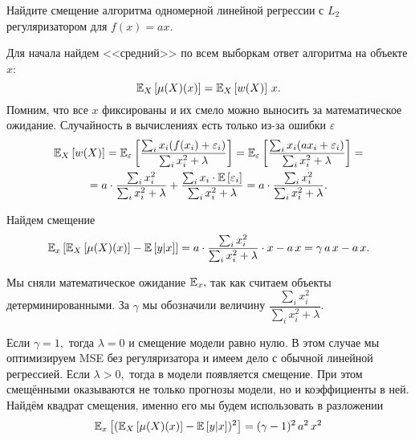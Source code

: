 \documentclass[12pt,fleqn]{article}
\begin{document}
\begin{vkProblem}
Найдите смещение алгоритма одномерной линейной регрессии с $L_2$ регуляризатором для $f(x) = ax$.
\end{vkProblem}
\begin{esSolution}
    Для начала найдем <<средний>> по всем выборкам ответ алгоритма на объекте $x$:
    $$
    \mathbb{E}_{X}\left[\mu(X)(x)\right] = \mathbb{E}_{X}\left[w(X)\right] \, x.
    $$
    Помним, что все $x$ фиксированы и их смело можно выносить за математическое ожидание. Случайность в вычислениях есть только из-за ошибки $\varepsilon$
    \begin{multline*}
        \EE_{X}\left[w(X)\right]
        =
        \EE_{\varepsilon} \left[\dfrac{\sum_i x_i (f(x_i) + \varepsilon_i)}{\sum_i x_i^2 + \lambda} \right]
        =
        \EE_{\varepsilon} \left[\dfrac{\sum_i x_i (ax_i + \varepsilon_i)}{\sum_i x_i^2 + \lambda} \right]
        = \\ =
        a \cdot \dfrac{\sum_i x_i^2}{\sum_i x_i^2 + \lambda} + \dfrac{\sum_i x_i \cdot \EE\left[\varepsilon_i\right]}{\sum_i x_i^2 + \lambda}
        =
        a \cdot \dfrac{\sum_i x_i^2}{\sum_i x_i^2 + \lambda}.
    \end{multline*}

    Найдем смещение
    $$
    \EE_{x} \left[\EE_{X}\left[\mu(X)(x)\right] - \EE\left[y|x\right]  \right]
    =
    a \cdot \dfrac{\sum_i x_i^2}{\sum_i x_i^2 + \lambda} \cdot x -  a\, x
    =
    \gamma\, a\, x -  a\, x.
    $$

    Мы сняли математическое ожидание $\mathbb{E}_{x},$ так как считаем объекты детерминированными.
    За $\gamma$ мы обозначили величину $\dfrac{\sum_i x_i^2}{\sum_i x_i^2 + \lambda}$.
    
    Если $\gamma = 1,$ тогда $\lambda = 0$ и смещение модели равно нулю.
    В этом случае мы оптимизируем MSE без регуляризатора и имеем дело с обычной линейной регрессией.
    Если $\lambda > 0,$ тогда в модели появляется смещение.
    При этом смещёнными оказываются не только прогнозы модели, но и коэффициенты в ней.
    Найдём квадрат смещения, именно его мы будем использовать в разложении
    $$
    \mathbb{E}_{x} \left[(\mathbb{E}_{X}\left[\mu(X)(x)\right] - \mathbb{E}\left[y|x\right])^2 \right] = (\gamma - 1)^2\, a^2\, x^2
    $$
\end{esSolution}
\end{document}
